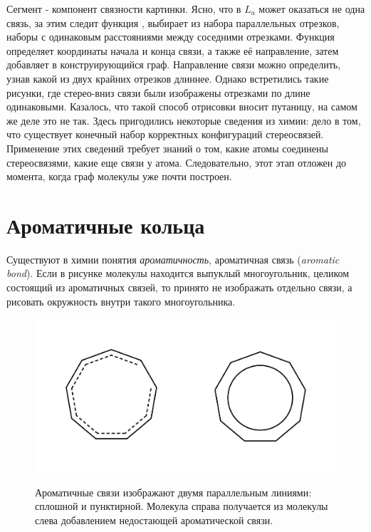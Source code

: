 \noindent
Сегмент - компонент связности картинки. Ясно, что в $L_{a}$ может оказаться не одна связь, за этим следит функция , выбирает
из набора параллельных отрезков, наборы с одинаковым расстояниями между соседними отрезками. Функция  определяет
координаты начала и конца связи, а также её направление, затем добавляет в конструирующийся граф. Направление связи можно определить, узнав
какой из двух крайних отрезков длиннее. Однако встретились такие рисунки, где стерео-вниз связи были изображены отрезками по длине одинаковыми.
Казалось, что такой способ отрисовки вносит путаницу, на самом же деле это не так. Здесь пригодились некоторые сведения из химии: дело в том, что
существует конечный набор корректных конфигураций стереосвязей. Применение этих сведений требует знаний о том, какие атомы соединены стереосвязями,
какие еще связи у атома. Следовательно, этот этап отложен до момента, когда граф молекулы уже почти построен.  


\section*{Ароматичные кольца}

Существуют в химии понятия \emph{ароматичность}, ароматичная связь (\emph{aromatic bond}). Если в рисунке молекулы находится выпуклый 
многоугольник, целиком состоящий из ароматичных связей, то принято не изображать отдельно связи, а рисовать окружность внутри такого многоугольника.

\begin{figure}[h]
\centering
{\includegraphics[scale=0.4, clip, trim = 32mm 32mm 35mm 35mm]{img/rings.pdf}}
\caption{Ароматичные связи изображают двумя параллельным линиями: сплошной и пунктирной. Молекула справа получается из молекулы слева добавлением
недостающей ароматической связи.}
\end{figure}

